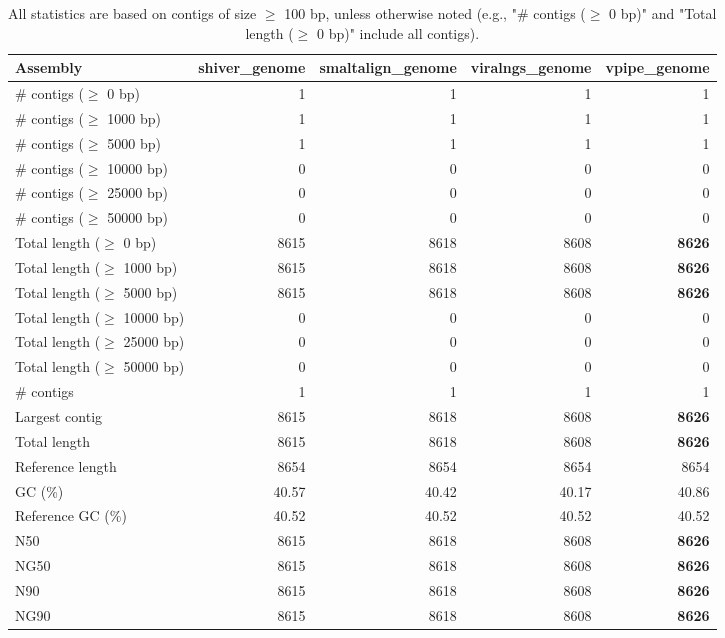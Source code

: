 \documentclass[12pt,a4paper]{article}
\begin{document}
\begin{table}[ht]
\begin{center}
\caption{All statistics are based on contigs of size $\geq$ 100 bp, unless otherwise noted (e.g., "\# contigs ($\geq$ 0 bp)" and "Total length ($\geq$ 0 bp)" include all contigs).}
\begin{tabular}{|l*{4}{|r}|}
\hline
Assembly & shiver\_genome & smaltalign\_genome & viralngs\_genome & vpipe\_genome \\ \hline
\# contigs ($\geq$ 0 bp) & 1 & 1 & 1 & 1 \\ \hline
\# contigs ($\geq$ 1000 bp) & 1 & 1 & 1 & 1 \\ \hline
\# contigs ($\geq$ 5000 bp) & 1 & 1 & 1 & 1 \\ \hline
\# contigs ($\geq$ 10000 bp) & 0 & 0 & 0 & 0 \\ \hline
\# contigs ($\geq$ 25000 bp) & 0 & 0 & 0 & 0 \\ \hline
\# contigs ($\geq$ 50000 bp) & 0 & 0 & 0 & 0 \\ \hline
Total length ($\geq$ 0 bp) & 8615 & 8618 & 8608 & {\bf 8626} \\ \hline
Total length ($\geq$ 1000 bp) & 8615 & 8618 & 8608 & {\bf 8626} \\ \hline
Total length ($\geq$ 5000 bp) & 8615 & 8618 & 8608 & {\bf 8626} \\ \hline
Total length ($\geq$ 10000 bp) & 0 & 0 & 0 & 0 \\ \hline
Total length ($\geq$ 25000 bp) & 0 & 0 & 0 & 0 \\ \hline
Total length ($\geq$ 50000 bp) & 0 & 0 & 0 & 0 \\ \hline
\# contigs & 1 & 1 & 1 & 1 \\ \hline
Largest contig & 8615 & 8618 & 8608 & {\bf 8626} \\ \hline
Total length & 8615 & 8618 & 8608 & {\bf 8626} \\ \hline
Reference length & 8654 & 8654 & 8654 & 8654 \\ \hline
GC (\%) & 40.57 & 40.42 & 40.17 & 40.86 \\ \hline
Reference GC (\%) & 40.52 & 40.52 & 40.52 & 40.52 \\ \hline
N50 & 8615 & 8618 & 8608 & {\bf 8626} \\ \hline
NG50 & 8615 & 8618 & 8608 & {\bf 8626} \\ \hline
N90 & 8615 & 8618 & 8608 & {\bf 8626} \\ \hline
NG90 & 8615 & 8618 & 8608 & {\bf 8626} \\ \hline

\end{tabular}
\end{center}
\end{table}
\end{document}
